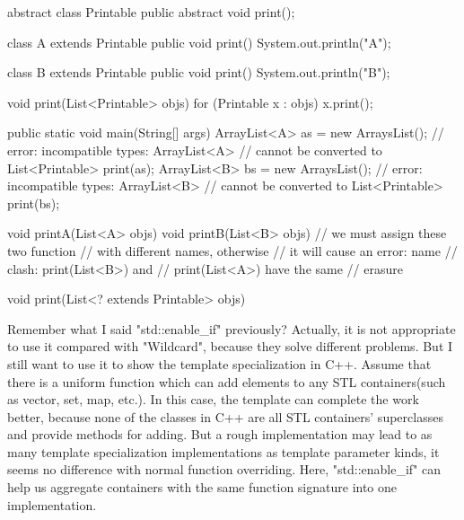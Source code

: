 \documentclass{article}
\begin{document}
\begin{minipage}[t]{0.48\textwidth}
\begin{JavaCode}[class]
abstract class Printable {
  public abstract void print();
}

class A extends Printable {
  public void print() {
    System.out.println("A");
  }
}

class B extends Printable {
  public void print() {
    System.out.println("B");
  }
}
\end{JavaCode}
\end{minipage}
\begin{minipage}[t]{0.48\textwidth}
\begin{JavaCode}
void print(List<Printable> objs) {
  for (Printable x : objs) {
    x.print();
  }
}

public static void main(String[] args) {
  ArrayList<A> as = new ArraysList();
  // error: incompatible types: ArrayList<A>
  // cannot be converted to List<Printable>
  print(as);
  ArrayList<B> bs = new ArraysList();
  // error: incompatible types: ArrayList<B>
  // cannot be converted to List<Printable>
  print(bs);
}
\end{JavaCode}
\end{minipage}
\begin{minipage}[t]{0.48\textwidth}
\begin{JavaCode}
void printA(List<A> objs) {}
void printB(List<B> objs) {}
// we must assign these two function
// with different names, otherwise
// it will cause an error: name
// clash: print(List<B>) and
// print(List<A>) have the same
// erasure
\end{JavaCode}
\end{minipage}
\begin{minipage}[t]{0.48\textwidth}
\begin{JavaCode}
void print(List<? extends Printable> objs) {}
\end{JavaCode}
\end{minipage}

Remember what I said "std::enable\_if" previously? Actually, it is not appropriate to use it compared with "Wildcard", because they solve different problems. But I still want to use it to show the template specialization in C++. Assume that there is a uniform function which can add elements to any STL containers(such as vector, set, map, etc.). In this case, the template can complete the work better, because none of the classes in C++ are all STL containers' superclasses and provide methods for adding. But a rough implementation may lead to as many template specialization implementations as template parameter kinds, it seems no difference with normal function overriding. Here, "std::enable\_if" can help us aggregate containers with the same function signature into one implementation.
\end{document}
